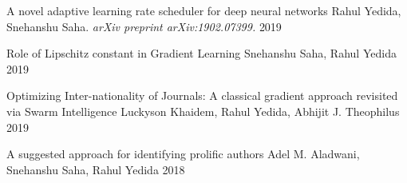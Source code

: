 

\begin{cvhonors}

  \cvhonor
    {A novel adaptive learning rate scheduler for deep neural networks}
    {Rahul Yedida, Snehanshu Saha. \textit{arXiv preprint arXiv:1902.07399.}}
    {} %
    {2019} %

  \cvhonor
    {Role of Lipschitz constant in Gradient Learning}
    {Snehanshu Saha, Rahul Yedida}
    {} %
    {2019} %

  \cvhonor
    {Optimizing Inter-nationality of Journals: A classical gradient approach revisited via Swarm Intelligence}
    {Luckyson Khaidem, Rahul Yedida, Abhijit J. Theophilus}
    {} %
    {2019} %
    
  \cvhonor
    {A suggested approach for identifying prolific authors}
    {Adel M. Aladwani, Snehanshu Saha, Rahul Yedida}
    {} %
    {2018} %

\end{cvhonors}